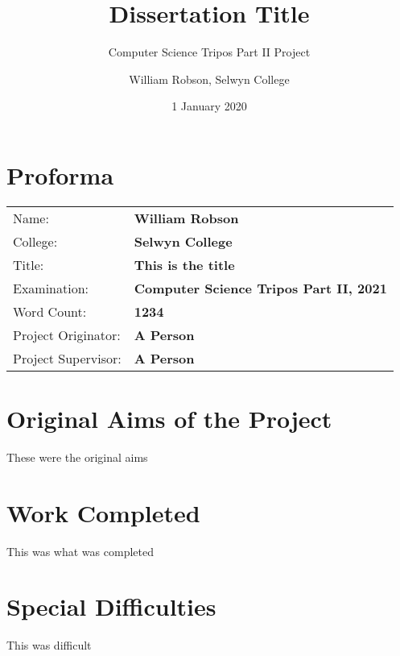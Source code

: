 
\newcommand{\thedate}{1 January 2020}

\title{Dissertation Title}
\subtitle{Computer Science Tripos Part II Project}
\author{William Robson, Selwyn College}
\date{\thedate}

\maketitle

\cleardoublepage

\setcounter{page}{1}

\section*{Proforma}

{\large

\begin{tabular}{ll}
    Name: & \textbf{William Robson} \\
    College: & \textbf{Selwyn College} \\
    Title: & \textbf{This is the title} \\
    Examination: & \textbf{Computer Science Tripos Part II, 2021} \\
    Word Count: & \textbf{1234} \\
    Project Originator: & \textbf{A Person} \\
    Project Supervisor: & \textbf{A Person} \\
\end{tabular}
}

\section*{Original Aims of the Project}

These were the original aims

\section*{Work Completed}

This was what was completed

\section*{Special Difficulties}

This was difficult

\pagebreak

